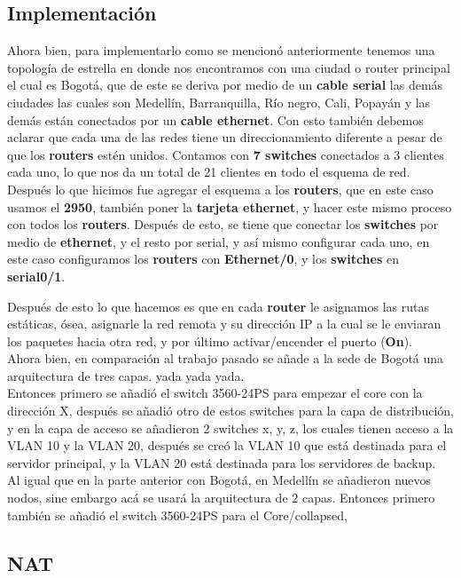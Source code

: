 \newpage
\subsection{Implementación}

Ahora bien, para implementarlo como se mencionó anteriormente tenemos una
topología de estrella en donde nos encontramos con una ciudad o router
principal el cual es Bogotá, que de este se deriva por medio de un
\textbf{cable serial} las demás ciudades las cuales son Medellín, Barranquilla,
Río negro, Cali, Popayán y las demás están conectados por un
\textbf{cable ethernet}. Con esto también debemos aclarar que cada una de las
redes tiene un direccionamiento diferente a pesar de que los \textbf{routers}
estén unidos. Contamos con \textbf{7 switches} conectados a 3 clientes cada uno,
lo que nos da un total de 21 clientes en todo el esquema de red.
\\

Después lo que hicimos fue agregar el esquema a los \textbf{routers}, que en
este caso usamos el \textbf{2950}, también poner la \textbf{tarjeta ethernet},
y hacer este mismo proceso con todos los \textbf{routers}. Después de esto, se
tiene que conectar los \textbf{switches} por medio de \textbf{ethernet}, y el
resto por serial, y así mismo configurar cada uno, en este caso configuramos
los \textbf{routers} con \textbf{Ethernet/0}, y los \textbf{switches} en
\textbf{serial0/1}.

Después de esto lo que hacemos es que en cada \textbf{router} le asignamos las
rutas estáticas, ósea, asignarle la red remota y su dirección IP a la cual se le
enviaran los paquetes hacia otra red, y por último activar/encender el puerto
(\textbf{On}).
\\

Ahora bien, en comparación al trabajo pasado se añade a la sede de Bogotá una
arquitectura de tres capas. yada yada yada.
\\

Entonces primero se añadió el switch 3560-24PS para empezar el core con la
dirección X, después se añadió otro de estos switches para la capa de
distribución, y en la capa de acceso se añadieron 2 switches x, y, z, los
cuales tienen acceso a la VLAN 10 y la VLAN 20, después se creó la VLAN 10 que
está destinada para el servidor principal, y la VLAN 20 está destinada para los 
servidores de backup.
\\

Al igual que en la parte anterior con Bogotá, en Medellín se añadieron nuevos
nodos, sine embargo acá se usará la arquitectura de 2 capas. Entonces primero 
también se añadió el switch 3560-24PS para el Core/collapsed, 



\subsection{NAT}

